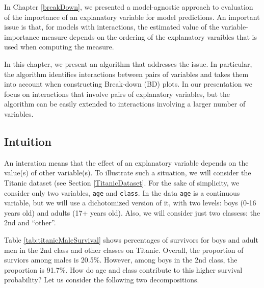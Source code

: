 \documentclass[12pt,]{krantz}
\begin{document}
In Chapter \ref{breakDown}, we presented a model-agnostic approach to evaluation of the importance of an explanatory variable for model predictions. An important issue is that, for models with interactions, the estimated value of the variable-importance measure depends on the ordering of the explanatory varaibles that is used when computing the measure.

In this chapter, we present an algorithm that addresses the issue. In particular, the algorithm identifies interactions between pairs of variables and takes them into account when constructing Break-down (BD) plots. In our presentation we focus on interactions that involve pairs of explanatory variables, but the algorithm can be easily extended to interactions involving a larger number of variables.

\hypertarget{iBDIntuition}{%
\subsection{Intuition}\label{iBDIntuition}}

An interation means that the effect of an explanatory variable depends on the value(s) of other variable(s). To illustrate such a situation, we will consider the Titanic dataset (see Section \ref{TitanicDataset}. For the sake of simplicity, we consider only two variables, \texttt{age} and \texttt{class}. In the data \texttt{age} is a continuous variable, but we will use a dichotomized version of it, with two levels: boys (0-16 years old) and adults (17+ years old). Also, we will consider just two classess: the 2nd and ``other''.

Table \ref{tab:titanicMaleSurvival} shows percentages of survivors for boys and adult men in the 2nd class and other classes on Titanic. Overall, the proportion of surviors among males is 20.5\%. However, among boys in the 2nd class, the proportion is 91.7\%. How do age and class contribute to this higher survival probability? Let us consider the following two decompositions.
\end{document}
